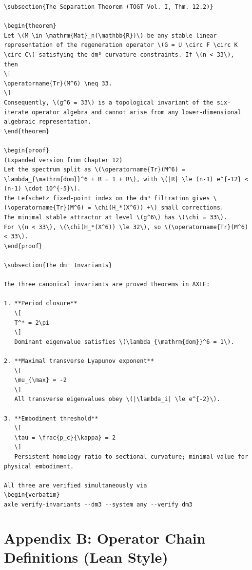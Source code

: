 \documentclass[19pt]{book}
\theoremstyle{plain}
\newtheorem{theorem}{Theorem}[section]
\theoremstyle{definition}
\theoremstyle{remark}
\begin{document}
\begin{enumerate}
\begin{verbatim}
\subsection{The Separation Theorem (TOGT Vol. I, Thm. 12.2)}

\begin{theorem}
Let \(M \in \mathrm{Mat}_n(\mathbb{R})\) be any stable linear representation of the regeneration operator \(G = U \circ F \circ K \circ C\) satisfying the dm³ curvature constraints. If \(n < 33\), then
\[
\operatorname{Tr}(M^6) \neq 33.
\]
Consequently, \(g^6 = 33\) is a topological invariant of the six-iterate operator algebra and cannot arise from any lower-dimensional algebraic representation.
\end{theorem}

\begin{proof}
(Expanded version from Chapter 12)
Let the spectrum split as \(\operatorname{Tr}(M^6) = \lambda_{\mathrm{dom}}^6 + R = 1 + R\), with \(|R| \le (n-1) e^{-12} < (n-1) \cdot 10^{-5}\).  
The Lefschetz fixed-point index on the dm³ filtration gives \(\operatorname{Tr}(M^6) = \chi(H_*(X^6)) +\) small corrections.  
The minimal stable attractor at level \(g^6\) has \(\chi = 33\).  
For \(n < 33\), \(\chi(H_*(X^6)) \le 32\), so \(\operatorname{Tr}(M^6) < 33\).
\end{proof}

\subsection{The dm³ Invariants}

The three canonical invariants are proved theorems in AXLE:

1. **Period closure**  
   \[
   T^* = 2\pi
   \]
   Dominant eigenvalue satisfies \(\lambda_{\mathrm{dom}}^6 = 1\).

2. **Maximal transverse Lyapunov exponent**  
   \[
   \mu_{\max} = -2
   \]
   All transverse eigenvalues obey \(|\lambda_i| \le e^{-2}\).

3. **Embodiment threshold**  
   \[
   \tau = \frac{p_c}{\kappa} = 2
   \]
   Persistent homology ratio to sectional curvature; minimal value for physical embodiment.

All three are verified simultaneously via
\begin{verbatim}
axle verify-invariants --dm3 --system any --verify dm3
\end{verbatim}

\chapter{Appendix B: Operator Chain Definitions (Lean Style)}


\end{enumerate}
\end{document}
